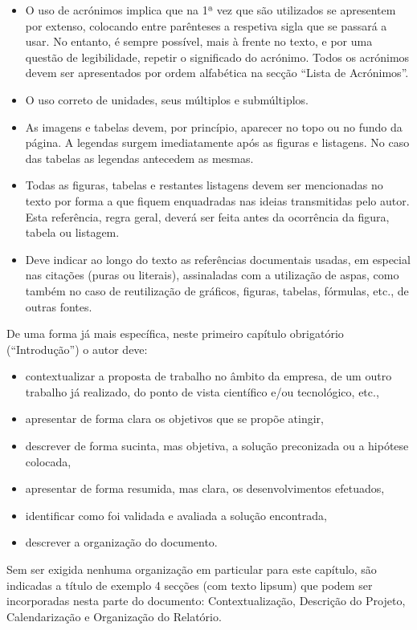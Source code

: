 \begin{itemize}
	\item O uso de acrónimos implica que na 1ª vez que são utilizados se apresentem por extenso, colocando entre parênteses a respetiva sigla que se passará a usar. No entanto, é sempre possível, mais à frente no texto, e por uma questão de legibilidade, repetir o significado do acrónimo. Todos os acrónimos devem ser apresentados por ordem alfabética na secção ``Lista de Acrónimos''.
	\item O uso correto de unidades, seus múltiplos e submúltiplos.
	\item As imagens e tabelas devem, por princípio, aparecer no topo ou no fundo da página. A legendas surgem imediatamente após as figuras e listagens. No caso das tabelas as legendas antecedem as mesmas.
	\item Todas as figuras, tabelas e restantes listagens devem ser mencionadas no texto por forma a que fiquem enquadradas nas ideias transmitidas pelo autor. Esta referência, regra geral, deverá ser feita antes da ocorrência da figura, tabela ou listagem.
	\item Deve indicar ao longo do texto as referências documentais usadas, em especial nas citações (puras ou literais), assinaladas com a utilização de aspas, como também no caso de reutilização de gráficos, figuras, tabelas, fórmulas, etc., de outras fontes.
\end{itemize}

De uma forma já mais específica, neste primeiro capítulo obrigatório (``Introdução'') o autor deve:

\begin{itemize}
	\item contextualizar a proposta de trabalho no âmbito da empresa, de um outro trabalho já realizado, do ponto de vista científico e/ou tecnológico, etc.,
	\item apresentar de forma clara os objetivos que se propõe atingir,
	\item descrever de forma sucinta, mas objetiva, a solução preconizada ou a hipótese colocada,
	\item apresentar de forma resumida, mas clara, os desenvolvimentos efetuados,
	\item identificar como foi validada e avaliada a solução encontrada,
	\item descrever a organização do documento.
\end{itemize}

Sem ser exigida nenhuma organização em particular para este capítulo, são indicadas a título de exemplo 4 secções (com texto \gls{lipsum}) que podem ser incorporadas nesta parte do documento: Contextualização, Descrição do Projeto, Calendarização e Organização do Relatório. 	

